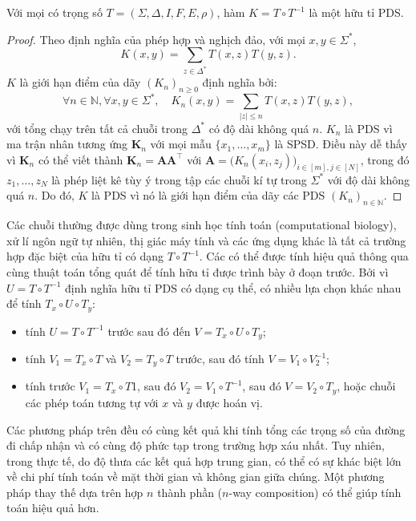 \begin{thm}
  Với mọi  có trọng số $T = (\Sigma, \Delta, I, F, E, \rho)$,
  hàm $K = T \circ T^{-1}$ là một  hữu tỉ PDS.
\end{thm}

\begin{proof}
  Theo định nghĩa của phép hợp và nghịch đảo, với mọi $x, y \in \Sigma^\ast$,
  \begin{equation}
    K(x, y) = \sum_{z \in \Delta^\ast} T(x, z) T(y, z).
  \end{equation}$K$ là giới hạn điểm của dãy  $(K_n)_{n\ge 0}$ định
  nghĩa bởi: \begin{equation}
    \forall n \in \mathbb{N}, \forall x, y \in \Sigma^\ast, \quad K_n(x, y) =
    \sum_{|z| \le n} T(x, z) T(y, z),
  \end{equation} với tổng chạy trên tất cả chuỗi trong $\Delta^\ast$ có độ dài
  không quá $n$. $K_n$ là PDS vì ma trận  nhân tương ứng
  $\mathbf{K}_n$ với mọi mẫu $\{x_1, \dots, x_m\}$ là SPSD. Điều này dễ thấy vì
  $\mathbf{K}_n$ có thể viết thành $\mathbf{K}_n = \mathbf{A}
  \mathbf{A}^\intercal$ với $\mathbf{A} = \bigl( K_n(x_i, z_j) \bigr )_{i \in
  [m], j \in [N]}$, trong đó $z_1,\dots, z_N$ là phép liệt kê tùy ý trong tập
  các chuỗi kí tự trong $\Sigma^\ast$ với độ dài không quá $n$. Do đó, $K$ là
  PDS vì nó là giới hạn điểm của dãy các  PDS $(K_n)_{n \in
  \mathbb{N}}$.
\end{proof}

Các  chuỗi thường được dùng trong sinh học tính toán (computational
biology), xử lí ngôn ngữ tự nhiên, thị giác máy tính và các ứng dụng khác là
tất cả trường hợp đặc biệt của  hữu tỉ có dạng $T \circ T^{-1}$. Các
 có thể được tính hiệu quả thông qua cùng thuật toán tổng quát để
tính  hữu tỉ được trình bày ở đoạn trước. Bởi vì  $U
= T \circ T^{-1}$ định nghĩa  hữu tỉ PDS có dạng cụ thể, có nhiều
lựa chọn khác nhau để tính $T_x \circ U \circ T_y$: \begin{itemize}
  \item tính $U = T \circ T^{-1}$ trước sau đó đến $V = T_x \circ U \circ T_y$;
  \item tính $V_1 = T_x \circ T$ và $V_2 = T_y \circ T$ trước, sau đó tính $V =
    V_1 \circ V_2^{-1}$;
  \item tính trước $V_1 = T_x \circ T$1, sau đó $V_2 = V_1 \circ T^{-1}$, sau
    đó $V = V_2 \circ T_y$, hoặc chuỗi các phép toán tương tự với $x$ và $y$
    được hoán vị.
\end{itemize} Các phương pháp trên đều có cùng kết quả khi tính tổng các
trọng số của đường đi chấp nhận và có cùng độ phức tạp trong trường hợp xáu
nhất. Tuy nhiên, trong thực tế, do độ thưa các kết quả hợp trung gian, có thể
có sự khác biệt lớn về chi phí tính toán về mặt thời gian và không gian giữa
chúng. Một phương pháp thay thế dựa trên hợp $n$ thành phần ($n$-way
composition) có thể giúp tính toán hiệu quả hơn.

